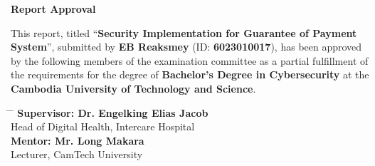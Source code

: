 \newpage
\thispagestyle{empty}

\begingroup
\singlespacing

\begin{center}
    {\huge \textbf{Report Approval}}
\end{center}

\vspace{1cm}

\noindent
This report, titled ``\textbf{Security Implementation for Guarantee of Payment System}'', submitted by \textbf{EB Reaksmey} (ID: \textbf{6023010017}), has been approved by the following members of the examination committee as a partial fulfillment of the requirements for the degree of \textbf{Bachelor's Degree in Cybersecurity} at the \textbf{Cambodia University of Technology and Science}.

\vspace{1cm}


\vspace{0.5cm}

\newlength{\committeelabelwidth}
\begin{tabbing}
    \hspace{5cm} \= \hspace{6cm} \= \hspace{4cm} \kill
    \textbf{Supervisor\hspace{1.2cm}: Dr. Engelking Elias Jacob} \> \> \underline{\hspace{4cm}} \\[0.3cm]
    Head of Digital Health, Intercare Hospital \\[0.6cm]
    \textbf{Mentor: Mr. Long Makara} \> \> \underline{\hspace{4cm}} \\[0.3cm]
    Lecturer, CamTech University
\end{tabbing}

\vspace{1cm}


\vspace{0.5cm}

